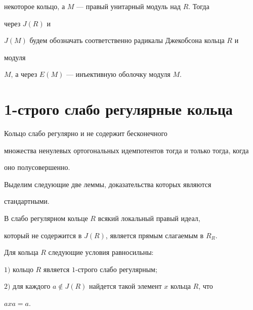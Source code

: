 некоторое кольцо, а $M$ --- правый унитарный модуль над $R$. Тогда 


через $J(R)$ и  


$J(M)$ будем обозначать соответственно радикалы Джекобсона кольца $R$ и 


модуля  


$M$, а через $E(M)$ --- инъективную оболочку модуля $M$. 


 


 


\section{1-строго слабо регулярные кольца} 


 


 


\begin{lems} 


Кольцо слабо регулярно и не содержит бесконечного 


множества ненулевых ортогональных идемпотентов тогда и только тогда, когда 


оно полусовершенно. 


\end{lems} 


 


Выделим следующие две леммы, доказательства которых являются 


стандартными.  


 


\begin{lems} 


В слабо регулярном кольце $R$ всякий локальный правый идеал, 


который не содержится в $J(R)$, является прямым слагаемым в $R_R$.  


\end{lems} 


 


\begin{lems} 


Для кольца $R$ следующие условия равносильны\/${:}$ 


 


$1)$ кольцо $R$ является $1$-строго слабо регулярным\/$;$ 


 


$2)$ для каждого $a\notin J(R)$ найдется такой элемент $x$ кольца $R$, что 


$axa=a$.  


\end{lems} 





